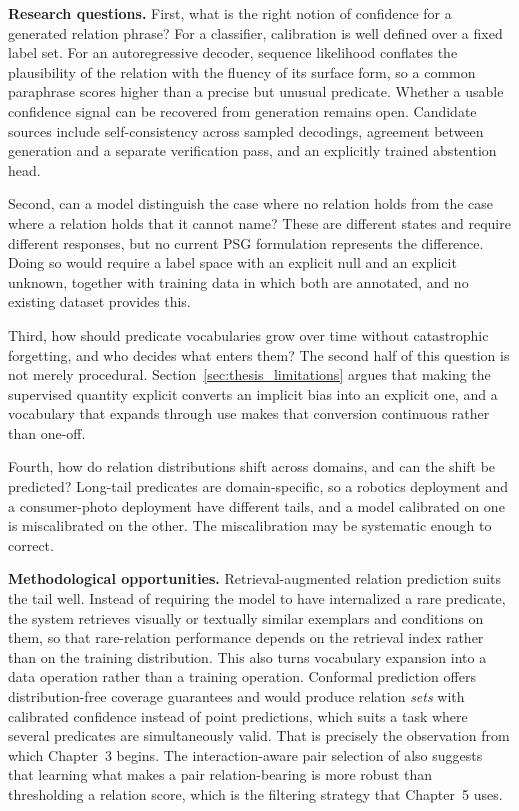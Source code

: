 \noindent \textbf{Research questions.}
First, what is the right notion of confidence for a generated relation phrase? For a classifier, calibration is well defined over a fixed label set. For an autoregressive decoder, sequence likelihood conflates the plausibility of the relation with the fluency of its surface form, so a common paraphrase scores higher than a precise but unusual predicate. Whether a usable confidence signal can be recovered from generation remains open. Candidate sources include self-consistency across sampled decodings, agreement between generation and a separate verification pass, and an explicitly trained abstention head.

Second, can a model distinguish the case where no relation holds from the case where a relation holds that it cannot name? These are different states and require different responses, but no current PSG formulation represents the difference. Doing so would require a label space with an explicit null and an explicit unknown, together with training data in which both are annotated, and no existing dataset provides this.

Third, how should predicate vocabularies grow over time without catastrophic forgetting, and who decides what enters them? The second half of this question is not merely procedural. Section~\ref{sec:thesis_limitations} argues that making the supervised quantity explicit converts an implicit bias into an explicit one, and a vocabulary that expands through use makes that conversion continuous rather than one-off.

Fourth, how do relation distributions shift across domains, and can the shift be predicted? Long-tail predicates are domain-specific, so a robotics deployment and a consumer-photo deployment have different tails, and a model calibrated on one is miscalibrated on the other. The miscalibration may be systematic enough to correct.

\noindent \textbf{Methodological opportunities.}
Retrieval-augmented relation prediction suits the tail well. Instead of requiring the model to have internalized a rare predicate, the system retrieves visually or textually similar exemplars and conditions on them, so that rare-relation performance depends on the retrieval index rather than on the training distribution. This also turns vocabulary expansion into a data operation rather than a training operation. Conformal prediction offers distribution-free coverage guarantees and would produce relation \emph{sets} with calibrated confidence instead of point predictions, which suits a task where several predicates are simultaneously valid. That is precisely the observation from which Chapter~3 begins. The interaction-aware pair selection of \citet{li2025inova} also suggests that learning what makes a pair relation-bearing is more robust than thresholding a relation score, which is the filtering strategy that Chapter~5 uses.

